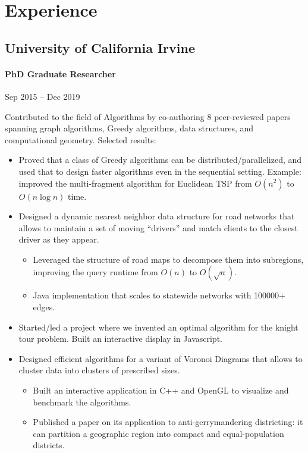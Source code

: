 \documentclass[letterpaper,10pt,oneside]{article}
\newcommand{\note}[1]{}
\begin{document}
\section*{Experience}
\subsection*{University of California Irvine}
\vspace{-3px}
\paragraph*{PhD Graduate Researcher} \hfill Sep 2015 -- Dec 2019

\vspace{2px}
\noindent Contributed to the field of Algorithms by co-authoring 8 peer-reviewed papers spanning graph algorithms, Greedy algorithms, data structures, and computational geometry. Selected results:
\begin{itemize}[leftmargin=15px]
	\item Proved that a class of Greedy algorithms can be distributed/parallelized, and used that to design faster algorithms even in the sequential setting. Example: improved the multi-fragment algorithm for Euclidean TSP from $O(n^2)$ to $O(n\log n)$ time.
	\item Designed a dynamic nearest neighbor data structure for road networks that allows to maintain a set of moving  ``drivers'' and match clients to the closest driver as they appear.
	\begin{itemize}[leftmargin=15px,topsep=0px]
		\item Leveraged the structure of road maps to decompose them into subregions, improving the query runtime from $O(n)$ to $O(\sqrt{n})$.\note{should I use big O notation in a resume?}
		\item Java implementation that scales to statewide networks with 100000+ edges.    
	\end{itemize}
	\item Started/led a project where we invented an optimal algorithm for the knight tour problem. Built an interactive display in Javascript.
	\item Designed efficient algorithms for a variant of Voronoi Diagrams that allows to cluster data into clusters of prescribed sizes.
	\begin{itemize}[leftmargin=15px,topsep=0px]
		\item Built an interactive application in C++ and OpenGL to visualize and benchmark the algorithms.
		\item Published a paper on its application to anti-gerrymandering districting: it can partition a geographic region into compact and equal-population districts.
	\end{itemize}
\end{itemize}
\end{document}
